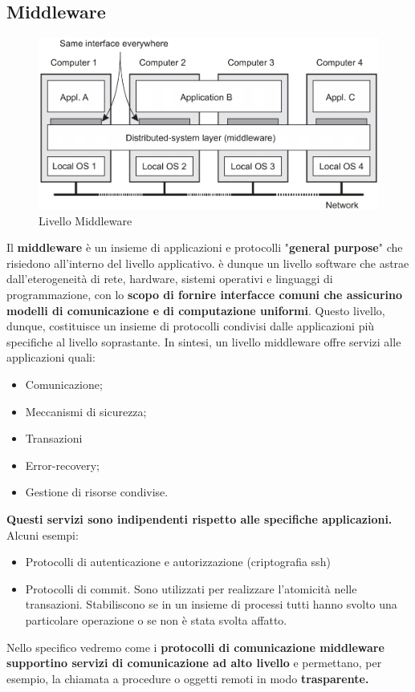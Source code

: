 \documentclass[12pt]{article}
\begin{document}
	\subsection{Middleware}	
		\begin{figure}[h!]
			\centering
			\includegraphics[scale=0.50]{img/middle.png}
			\caption{Livello Middleware}
		\end{figure}
		Il \textbf{middleware} è un insieme di applicazioni e protocolli "\textbf{general purpose}" che risiedono all'interno del livello applicativo. è dunque un livello software che astrae dall'eterogeneità di rete, hardware, sistemi operativi e linguaggi di programmazione, con lo \textbf{scopo di fornire interfacce comuni che assicurino  modelli di comunicazione e di computazione uniformi}.  Questo livello, dunque, costituisce un insieme di protocolli condivisi dalle applicazioni più specifiche al livello soprastante.
		In sintesi, un livello middleware offre servizi alle applicazioni quali:
		\begin{itemize}
			\item Comunicazione;
			\item Meccanismi di sicurezza;
			\item Transazioni
			\item Error-recovery;
			\item Gestione di risorse condivise.
		\end{itemize}
		\textbf{Questi servizi sono indipendenti rispetto alle specifiche applicazioni.} 
		Alcuni esempi:
		\begin{itemize}
			\item Protocolli di autenticazione e autorizzazione (criptografia ssh)
			\item Protocolli di commit. Sono utilizzati per realizzare l'atomicità nelle transazioni. Stabiliscono se in un insieme di processi tutti hanno svolto una particolare operazione o se non è stata svolta affatto.
		\end{itemize}
		Nello specifico vedremo come i \textbf{protocolli di comunicazione middleware supportino servizi di comunicazione ad alto livello} e permettano, per esempio, la chiamata a procedure o oggetti remoti in modo \textbf{trasparente.}
			 
\end{document}
